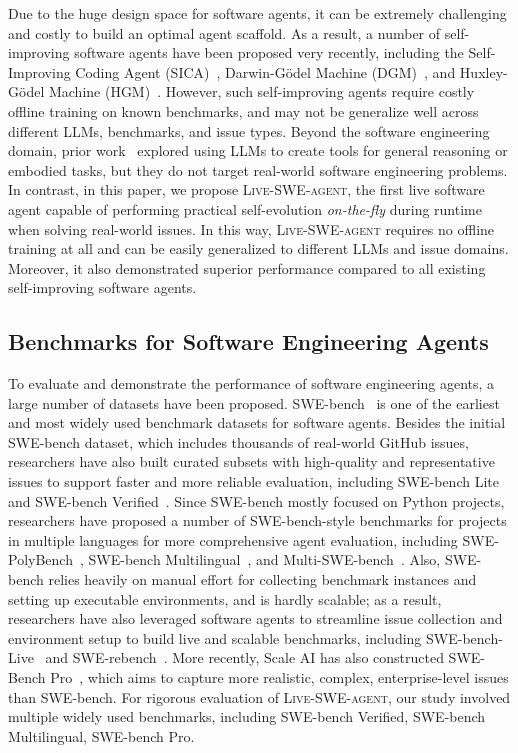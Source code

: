 \documentclass{article}
\renewcommand{\cite}{\citep}
\newcommand{\livesweagent}{\textsc{Live-SWE-agent}\xspace}
\newcommand{\swebench}{SWE-bench\xspace}
\newcommand{\swebenchpro}{SWE-Bench Pro\xspace}
\begin{document}
Due to the huge design space for software agents, it can be extremely challenging and costly to build an optimal agent scaffold. As a result, a number of self-improving software agents have been proposed very recently, including the Self-Improving Coding Agent (SICA)~\citep{robeyns2025sica}, Darwin-Gödel Machine (DGM)~\citep{zhang2025darwin}, and Huxley-Gödel Machine (HGM)~\citep{wang2025huxley}. However, such self-improving agents require costly offline training on known benchmarks, and may not be generalize well across different LLMs, benchmarks, and issue types.
Beyond the software engineering domain, prior work~\cite{llmastool, wang2024voyager, qiu2025alitageneralistagentenabling, qian2024creatortoolcreationdisentangling, wang2024troveinducingverifiableefficient} explored using LLMs to create tools for general reasoning or embodied tasks, but they do not target real-world software engineering problems.
In contrast, in this paper, we propose \livesweagent, the first live software agent capable of performing practical self-evolution \emph{on-the-fly} during runtime when solving real-world issues. In this way, \livesweagent requires no offline training at all and can be easily generalized to different LLMs and issue domains. Moreover, it also demonstrated superior performance compared to all existing self-improving software agents. 


\subsection{Benchmarks for Software Engineering Agents}

To evaluate and demonstrate the performance of software engineering agents, a large number of datasets have been proposed. \swebench~\citep{jimenez2023swe} is one of the earliest and most widely used benchmark datasets for software agents. Besides the initial \swebench dataset, which includes thousands of real-world GitHub issues, researchers have also built curated subsets with high-quality and representative issues to support faster and more reliable evaluation, including \swebench Lite~\citep{jimenez2023swe} and \swebench Verified~\citep{sbv}. Since \swebench mostly focused on Python projects, researchers have proposed a number of \swebench-style benchmarks for projects in multiple languages for more comprehensive agent evaluation, including SWE-PolyBench~\citep{rashid2025swe}, \swebench Multilingual~\citep{sbm}, and Multi-SWE-bench~\citep{zan2025multi}. Also, \swebench relies heavily on manual effort for
collecting benchmark instances and setting up executable environments, and is hardly scalable; as a result, researchers have also leveraged software agents to streamline issue collection and environment setup to build live and scalable benchmarks, including SWE-bench-Live~\citep{zhang2025swe} and SWE-rebench~\cite{badertdinov2025swe}. More recently, Scale AI has also constructed \swebenchpro~\citep{deng2025swe}, which aims to capture more realistic, complex, enterprise-level issues than SWE-bench. For rigorous evaluation of \livesweagent, our study involved multiple widely used benchmarks, including \swebench Verified, \swebench Multilingual, \swebench Pro.
\end{document}
